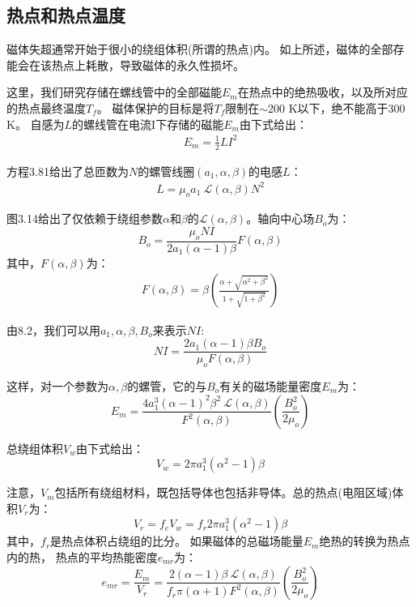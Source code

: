 \subsection{热点和热点温度}
磁体失超通常开始于很小的绕组体积(所谓的热点)内。
如上所述，磁体的全部存能会在该热点上耗散，导致磁体的永久性损坏。

这里，我们研究存储在螺线管中的全部磁能$E_m$在热点中的绝热吸收，以及所对应的热点最终温度$T_f$。
磁体保护的目标是将$T_f$限制在$\sim$200 K以下，绝不能高于300 K。
自感为$L$的螺线管在电流I下存储的磁能$E_m$由下式给出：
\begin{align*}%
E_m=\frac{1}{2}LI^2 \tag{3.79}
\end{align*}

方程3.81给出了总匝数为$N$的螺管线圈$(a_1,\alpha,\beta)$的电感$L$：
\begin{align*}%
L=\mu_oa_1\ \mathcal{L}(\alpha,\beta)N^2 \tag{3.81}
\end{align*}

图3.14给出了仅依赖于绕组参数$\alpha$和$\beta$的$\mathcal{L}(\alpha,\beta)$。轴向中心场$B_o$为：
\begin{equation}%
B_o=\frac{\mu_oNI}{2a_1(\alpha-1)\beta}F(\alpha,\beta)
\end{equation}
其中，$F(\alpha,\beta)$为：
\begin{align*}%
F(\alpha,\beta)=\beta\left(\frac{\alpha+\sqrt{\alpha^2+\beta^2}}{1+\sqrt{1+\beta^2}}\right) \tag{3.13b}
\end{align*}

由8.2，我们可以用$a_1,\alpha,\beta,B_o$来表示$NI$:
\begin{equation}%
NI=\frac{2a_1(\alpha-1)\beta B_o}{\mu_oF(\alpha,\beta)}
\end{equation}

这样，对一个参数为$\alpha,\beta$的螺管，它的与$B_o$有关的磁场能量密度$E_m$为：
\begin{equation}%
E_m=\frac{4a_{1}^{3}(\alpha-1)^2\beta^2\ \mathcal{L}(\alpha,\beta)}{F^2(\alpha,\beta)}\left(\frac{B_{o}^{2}}{2\mu_o}\right)
\end{equation}

总绕组体积$V_w$由下式给出：
\begin{equation}%
V_w=2\pi a_{1}^{3}(\alpha^2-1)\beta
\end{equation}

注意，$V_m$包括所有绕组材料，既包括导体也包括非导体。总的热点(电阻区域)体积$V_r$为：
\begin{equation}%
V_r=f_eV_w=f_r2\pi a_{1}^{3}(\alpha^2-1)\beta
\end{equation}
其中，$f_r$是热点体积占绕组的比分。
如果磁体的总磁场能量$E_m$绝热的转换为热点内的热，
热点的平均热能密度$e_{mr}$为：
\begin{equation}%
e_{mr}=\frac{E_m}{V_r}=\frac{2(\alpha-1)\beta\ \mathcal{L}(\alpha,\beta)}{f_r\pi(\alpha+1)F^2(\alpha,\beta)}\left(\frac{B_{o}^{2}}{2\mu_o}\right)
\end{equation}

